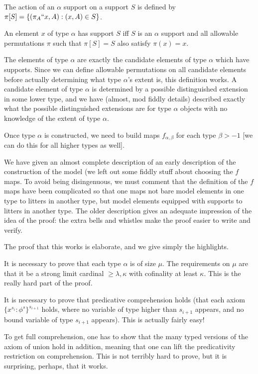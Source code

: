 \documentclass{slides}
\begin{document}
\begin{slide}

The action of an $\alpha$ support on a support $S$ is defined by $\pi[S] = \{(\pi_A``x,A):(x,A)\in S\}$.

An element $x$ of type $\alpha$ has support $S$ iff $S$ is an $\alpha$ support and all allowable permutations $\pi$ such that $\pi[S]=S$ also satisfy $\pi(x)=x$.

The elements of type $\alpha$ are exactly the candidate elements of type $\alpha$ which have supports.  Since we can define allowable permutations on all candidate elements
before actually determining what type $\alpha$'s extent is, this definition works.  A candidate element of type $\alpha$ is determined by a possible distinguished extension in some lower type,
and we have (almost, mod fiddly details) described exactly what the possible distinguished extensions are for type $\alpha$ objects with no knowledge of the extent of type $\alpha$.

Once type $\alpha$ is constructed, we need to build maps $f_{\alpha,\beta}$ for each type $\beta>-1$ [we can do this for all higher types as well].

\end{slide}

\begin{slide}

We have given an almost complete description of an early description of the construction of the model (we left out some fiddly stuff about choosing the $f$ maps.  To avoid being disingenuous, we must comment
that the definition of the $f$ maps have been complicated so that one maps not bare model elements in one type to litters in another type, but model elements equipped with supports to litters in another type.
The older description gives an adequate impression of the idea of the proof:  the extra bells and whistles make the proof easier to write and verify.

The proof that this works is elaborate, and we give simply the highlights.

It is necessary to prove that each type $\alpha$ is of size $\mu$.  The requirements on $\mu$ are that it be a strong limit cardinal $\geq\lambda,\kappa$ with cofinality at least $\kappa$.  This is the really hard part of the proof.

\end{slide}

\begin{slide}

It is necessary to prove that predicative comprehension holds (that each axiom $\{x^{s_i}:\phi^s\}^{s_{i+1}}$ holds, where no variable of type higher than $s_{i+1}$ appears, and no bound variable of type $s_{i+1}$ appears).
This is actually fairly easy!

To get full comprehension, one has to show that the many typed versions of the axiom of union hold in addition, meaning that one can lift the predicativity restriction on comprehension.  This is not terribly hard to prove, but it is surprising, perhaps, that it works.

\end{slide}
\end{document}
